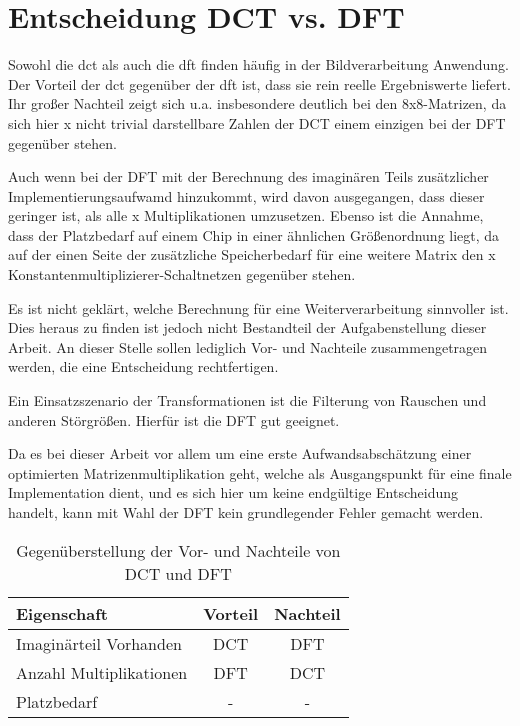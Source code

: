  \section{Entscheidung DCT vs. DFT}
 Sowohl die \gls{dct} als auch die \gls{dft} finden häufig in der Bildverarbeitung Anwendung. Der Vorteil der \gls{dct} gegenüber der \gls{dft} ist,
 dass sie rein reelle Ergebniswerte liefert. Ihr großer Nachteil zeigt sich u.a. insbesondere deutlich bei den 8x8-Matrizen, da sich hier x 
 nicht trivial darstellbare Zahlen der DCT einem einzigen bei der DFT gegenüber stehen.
 
 Auch wenn bei der DFT mit der Berechnung des imaginären Teils zusätzlicher Implementierungsaufwamd hinzukommt, wird davon ausgegangen, dass dieser geringer ist, 
 als alle x Multiplikationen umzusetzen. Ebenso ist die Annahme, dass der Platzbedarf auf einem Chip in einer ähnlichen Größenordnung liegt, da auf der einen Seite
 der zusätzliche Speicherbedarf für eine weitere Matrix den x Konstantenmultiplizierer-Schaltnetzen gegenüber stehen.
 
 Es ist nicht geklärt, welche Berechnung für eine Weiterverarbeitung sinnvoller ist. Dies heraus zu finden ist jedoch nicht Bestandteil der Aufgabenstellung dieser Arbeit.
 An dieser Stelle sollen lediglich Vor- und Nachteile zusammengetragen werden, die eine Entscheidung rechtfertigen.
 
 Ein Einsatzszenario der Transformationen ist die Filterung von Rauschen und anderen Störgrößen. Hierfür ist die DFT gut geeignet. 
 
 
 Da es bei dieser Arbeit vor allem um eine erste Aufwandsabschätzung einer optimierten Matrizenmultiplikation geht, welche als Ausgangspunkt für eine finale Implementation 
 dient, und es sich hier um keine endgültige Entscheidung handelt, kann mit Wahl der DFT kein grundlegender Fehler gemacht werden.
 
 
 \begin{table}[ht]
 \centering
  \caption{Gegenüberstellung der Vor- und Nachteile von DCT und DFT}
  \begin{tabular}{lcc}
      Eigenschaft          & Vorteil   & Nachteil\\
\hline
   Imaginärteil Vorhanden  & DCT       & DFT \\
   Anzahl Multiplikationen & DFT       & DCT\\
   Platzbedarf             &  -        &  - \\
  \end{tabular}
  \label{tab:gegenüberstellung_dct_dft}
 \end{table}
